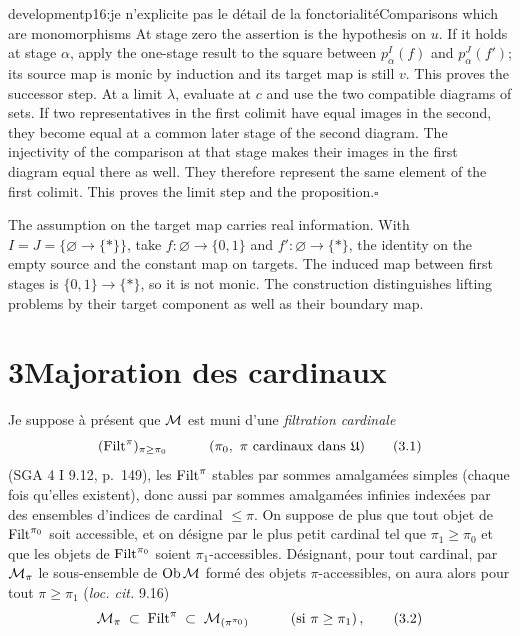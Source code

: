 \begin{dcomment}{development}{p16:je n'explicite pas le détail de la fonctorialité}{Comparisons which are monomorphisms}
At stage zero the assertion is the hypothesis on $u$. If it holds at stage $\alpha$, apply the one-stage result to the square between $p_\alpha^I(f)$ and $p_\alpha^J(f')$; its source map is monic by induction and its target map is still $v$. This proves the successor step. At a limit $\lambda$, evaluate at $c$ and use the two compatible diagrams of sets. If two representatives in the first colimit have equal images in the second, they become equal at a common later stage of the second diagram. The injectivity of the comparison at that stage makes their images in the first diagram equal there as well. They therefore represent the same element of the first colimit. This proves the limit step and the proposition.\hfill$\square$

The assumption on the target map carries real information. With $I=J=\{\varnothing\to\{*\}\}$, take $f:\varnothing\to\{0,1\}$ and $f':\varnothing\to\{*\}$, the identity on the empty source and the constant map on targets. The induced map between first stages is $\{0,1\}\to\{*\}$, so it is not monic. The construction distinguishes lifting problems by their target component as well as their boundary map.
\end{dcomment}


\section*{3\quad Majoration des cardinaux}

Je suppose à présent que $\mathcal{M}$ est muni d'une \textit{filtration cardinale}
\[
(\Filt^\pi)_{\pi\geq\pi_0} \qquad\quad (\pi_0,\ \pi \text{ cardinaux dans } \mathfrak{U})
\tag*{(3.1)}
\]
(SGA 4 I 9.12, p.~149), les $\mathrm{Filt}^\pi$ stables par sommes amalgamées simples (chaque fois qu'elles existent), donc aussi par sommes amalgamées infinies indexées par des ensembles
d'indices de cardinal $\leq\pi$. On suppose de plus que tout objet de $\mathrm{Filt}^{\pi_0}$ soit accessible, et on désigne par  le plus petit cardinal tel que $\pi_1\geq\pi_0$ et que les objets de $\mathrm{Filt}^{\pi_0}$ soient $\pi_1$-accessibles. Désignant, pour tout cardinal, par $\mathcal{M}_\pi$ le sous-ensemble de $\mathrm{Ob}\,\mathcal{M}$ formé des objets $\pi$-accessibles, on aura alors pour tout $\pi\geq\pi_1$ (\textit{loc. cit.} 9.16)
\[
\cM_\pi \;\subset\; \Filt^\pi \;\subset\; \cM_{(\pi^{\pi_0})} \qquad\quad (\text{si } \pi\geq\pi_1)\,,
\tag*{(3.2)}
\]


